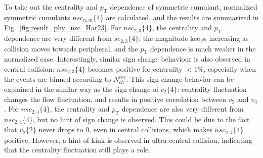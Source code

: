 To take out the centrality and $p_\text{T}$ dependence of symmetric cumulant, normalized symmetric cumulants $nsc_{n,m}\{4\}$ are calculated, and the results are summarized in Fig.~\ref{fig:result_phy_nsc_Har23}. For $nsc_{2,3}\{4\}$, the centrality and $p_\text{T}$ dependence are very different from $sc_{2,3}\{4\}$: the magnitude keeps increasing as collision moves towards peripheral, and the $p_\text{T}$ dependence is much weaker in the normalized case. Interestingly, similar sign change behaviour is also observed in central collision: $nsc_{2,3}\{4\}$ becomes positive for centrality $<1\%$, especially when the events are binned according to $N_{ch}^{rec}$. This sign change behavior can be explained in the similar way as the sign change of $c_2\{4\}$: centrality fluctuation changes the flow fluctuation, and results in positive correlation between $v_2$ and $v_3$. For $nsc_{2,4}\{4\}$, the centrality and $p_\text{T}$ dependence are also very different from $nsc_{2,4}\{4\}$, but no hint of sign change is observed. This could be due to the fact that $v_2\{2\}$ never drops to 0, even in central collisions, which makes $nsc_{2,4}\{4\}$ positive. However, a hint of kink is observed in ultra-central collision, indicating that the centrality fluctuation still plays a role.

